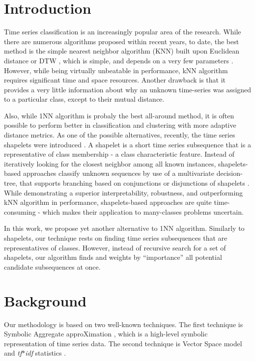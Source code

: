 \documentclass{llncs}
\begin{document}
\section{Introduction}
%
Time series classification is an increasingly popular area of the research. While there are numerous
algorithms proposed within recent years, to date, the best method is the simple nearest neighbor
algorithm (KNN) built upon Euclidean distance or DTW \cite{1NN}, which is simple, and
depends on a very few parameters \cite{ed}.
However, while being virtually unbeatable in performance, kNN algorithm requires significant time
and space resources. Another drawback is that it provides a very little information about why an
unknown time-series was assigned to a particular class, except to their mutual distance.

Also, while 1NN algorithm is probaly the best all-around method, it is often possible to perform
better in classification and clustering with more adaptive distance metrics. As one of the
possible alternatives, recently, the time series shapelets were introduced \cite{shapelet}.
A shapelet is a short time series subsequence that is a representative of class membership - a class
characteristic feature. Instead of iteratively looking for the closest neighbor among all
known instances, shapelets-based approaches classify unknown sequences by use of a multivariate
decision-tree, that supports branching based on conjunctions or disjunctions of shapelets
\cite{logical}. 
While demonstrating a superior interpretability, robustness, and outperforming kNN
algorithm in performance, shapelets-based approaches are quite time-consuming - which makes their
application to many-classes problems uncertain. 

In this work, we propose yet another alternative to 1NN algorithm. Similarly to shapelets, our
technique rests on finding time series subsequences that are representatives of classes. However,
instead of recursive search for a set of shapelets, our algorithm finds and weights by
``importance'' all potential candidate subsequences at once.

\section{Background}
Our methodology is based on two well-known techniques. The first technique is Symbolic Aggregate
approXimation \cite{sax}, which is a high-level symbolic representation of time series
data. The second technique is Vector Space model and \textit{tf$\ast$idf} statistics
\cite{salton}.
\end{document}
